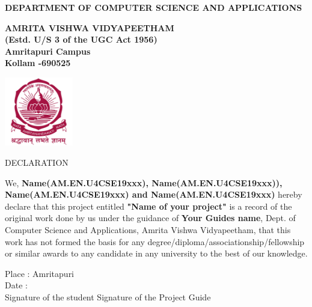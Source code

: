 \documentclass[oneside,12pt]{Classes/CUEDthesisPSnPDF}
\begin{document}
\pagebreak


\begin{center}

   {\normalsize {\bfseries{DEPARTMENT OF COMPUTER SCIENCE AND APPLICATIONS\\[1ex]}}}


    {\normalsize {\bfseries{AMRITA VISHWA VIDYAPEETHAM\\ (Estd. U/S 3 of the UGC Act 1956)\\ [1ex]Amritapuri  Campus \\[1ex] Kollam -690525\\[1ex]}}}

    \includegraphics[width=30mm]{UNIVEMBLEM.jpg} 


    \rmfamily\bfseries\upshape\Large

				DECLARATION \\[2ex]


   \end{center}

	\vspace{1pt}

We, \textbf{Name(AM.EN.U4CSE19xxx), Name(AM.EN.U4CSE19xxx)), Name(AM.EN.U4CSE19xxx) and Name(AM.EN.U4CSE19xxx)} hereby declare that this project entitled \textbf{"Name of your project"} is a record of the original work done by us under the guidance of \textbf{Your Guides name}, Dept. of Computer Science and Applications, Amrita Vishwa Vidyapeetham, that this work has not formed the basis for any degree/diploma/associationship/fellowship or similar awards to any candidate in any university to the best of our knowledge.\\

\vspace{60pt}

\begin{flushleft}

Place	:	Amritapuri\\[1ex]

Date	:	\\[15ex]

Signature of the student \hspace{90pt}	Signature of the Project Guide\\

\end{flushleft}

\setcounter{secnumdepth}{3}

\setcounter{tocdepth}{3}

\frontmatter %



\end{document}
